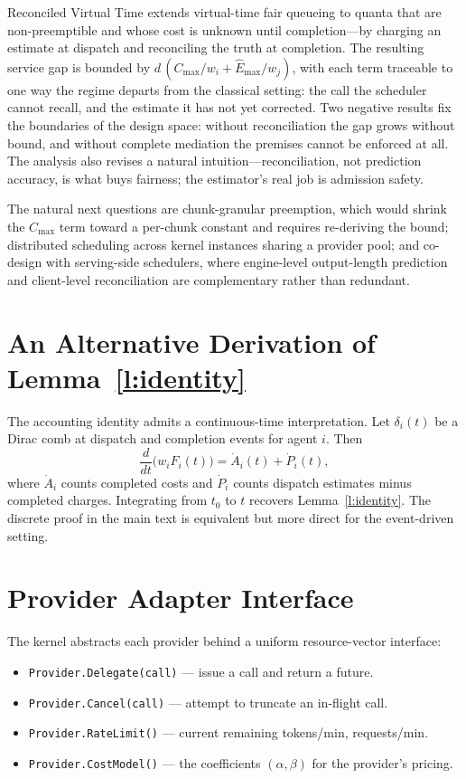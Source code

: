 \documentclass[letterpaper,11pt,leqno]{article}
\newcommand{\bib}{paper.bib}
\begin{document}
Reconciled Virtual Time extends virtual-time fair queueing to quanta that are non-preemptible and whose cost is unknown until completion---by charging an estimate at dispatch and reconciling the truth at completion. The resulting service gap is bounded by $d\,(C_{\max}/w_i + \hat{E}_{\max}/w_j)$, with each term traceable to one way the regime departs from the classical setting: the call the scheduler cannot recall, and the estimate it has not yet corrected. Two negative results fix the boundaries of the design space: without reconciliation the gap grows without bound, and without complete mediation the premises cannot be enforced at all. The analysis also revises a natural intuition---reconciliation, not prediction accuracy, is what buys fairness; the estimator's real job is admission safety.

The natural next questions are chunk-granular preemption, which would shrink the $C_{\max}$ term toward a per-chunk constant and requires re-deriving the bound; distributed scheduling across kernel instances sharing a provider pool; and co-design with serving-side schedulers, where engine-level output-length prediction and client-level reconciliation are complementary rather than redundant.


\appendix

\section{An Alternative Derivation of Lemma~\ref{l:identity}}\label{a:identity}

The accounting identity admits a continuous-time interpretation. Let $\delta_i(t)$ be a Dirac comb at dispatch and completion events for agent $i$. Then
\[
  \frac{d}{dt}\bigl(w_i F_i(t)\bigr) = \dot{A}_i(t) + \dot{P}_i(t),
\]
where $\dot{A}_i$ counts completed costs and $\dot{P}_i$ counts dispatch estimates minus completed charges. Integrating from $t_0$ to $t$ recovers Lemma~\ref{l:identity}. The discrete proof in the main text is equivalent but more direct for the event-driven setting.

\section{Provider Adapter Interface}\label{a:provider}

The kernel abstracts each provider behind a uniform resource-vector interface:

\begin{itemize}
\item \texttt{Provider.Delegate(call)} --- issue a call and return a future.
\item \texttt{Provider.Cancel(call)} --- attempt to truncate an in-flight call.
\item \texttt{Provider.RateLimit()} --- current remaining tokens/min, requests/min.
\item \texttt{Provider.CostModel()} --- the coefficients $(\alpha, \beta)$ for the provider's pricing.
\end{itemize}
\end{document}

